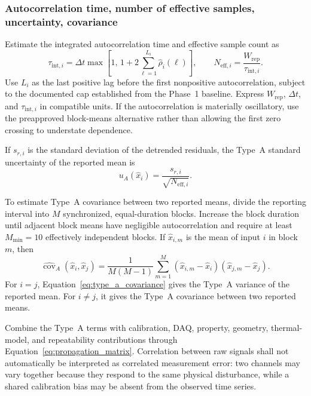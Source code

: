 \documentclass[11pt]{article}
\begin{document}
\subsubsection{Autocorrelation time, number of effective samples, uncertainty, covariance}
\label{sec:reported_uncertainty}

Estimate the integrated autocorrelation time and effective sample count as
\begin{equation}
    \tau_{\mathrm{int},i}
    =
    \Delta t
    \max
    \left[
        1,\,
        1+
        2\sum_{\ell=1}^{L_i}
        \widehat{\rho}_i(\ell)
    \right],
    \qquad
    N_{\mathrm{eff},i}
    =
    \frac{W_{\mathrm{rep}}}
    {\tau_{\mathrm{int},i}}.
    \label{eq:neff}
\end{equation}
Use $L_i$ as the last positive lag before the first nonpositive autocorrelation, subject to the documented cap established from the Phase~1 baseline. Express $W_{\mathrm{rep}}$, $\Delta t$, and $\tau_{\mathrm{int},i}$ in compatible units. If the autocorrelation is materially oscillatory, use the preapproved block-means alternative rather than allowing the first zero crossing to understate dependence.

If $s_{r,i}$ is the standard deviation of the detrended residuals, the Type~A standard uncertainty of the reported mean is
\begin{equation}
    u_A(\hat{x}_i)
    =
    \frac{s_{r,i}}
    {\sqrt{N_{\mathrm{eff},i}}}.
    \label{eq:type_a_mean_uncertainty}
\end{equation}

To estimate Type~A covariance between two reported means, divide the reporting interval into $M$ synchronized, equal-duration blocks. Increase the block duration until adjacent block means have negligible autocorrelation and require at least $M_{\min}=10$ effectively independent blocks. If $\hat{x}_{i,m}$ is the mean of input $i$ in block $m$, then
\begin{equation}
    \widehat{\operatorname{cov}}_{\!A}
    \left(\hat{x}_i,\hat{x}_j\right)
    =
    \frac{1}{M(M-1)}
    \sum_{m=1}^{M}
    \left(\hat{x}_{i,m}-\hat{x}_i\right)
    \left(\hat{x}_{j,m}-\hat{x}_j\right).
    \label{eq:type_a_covariance}
\end{equation}
For $i=j$, Equation~\eqref{eq:type_a_covariance} gives the Type~A variance of the reported mean. For $i\neq j$, it gives the Type~A covariance between two reported means.

Combine the Type~A terms with calibration, DAQ, property, geometry, thermal-model, and repeatability contributions through Equation~\eqref{eq:propagation_matrix}. Correlation between raw signals shall not automatically be interpreted as correlated measurement error: two channels may vary together because they respond to the same physical disturbance, while a shared calibration bias may be absent from the observed time series.
\end{document}
